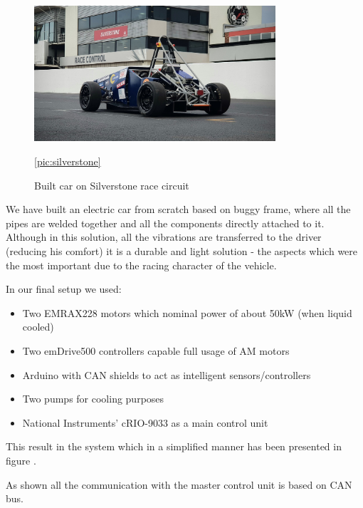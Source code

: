 \begin{figure}[b]
	\centering
    	\includegraphics[width=0.8\textwidth]{figures/silverstone.jpg}
        \caption{Built car on Silverstone race circuit}
        \ref{pic:silverstone}
\end{figure}


We have built an electric car from scratch based on buggy frame, where all the pipes are welded together and all the components directly attached to it. Although in this solution, all the vibrations are transferred to the driver (reducing his comfort) it is a durable and light solution - the aspects which were the most important due to the racing character of the vehicle. 

In our final setup we used:
\begin{itemize}
    \item Two EMRAX228 motors which nominal power of about 50kW (when liquid cooled)
    \item Two emDrive500 controllers capable full usage of AM motors
    \item Arduino with CAN shields to act as intelligent sensors/controllers
    \item Two  pumps for cooling purposes
    \item National Instruments' cRIO-9033 as a main control unit
\end{itemize}

This result in the system which in a simplified manner has been presented in figure .


As shown all the communication with the master control unit is based on CAN bus. 






